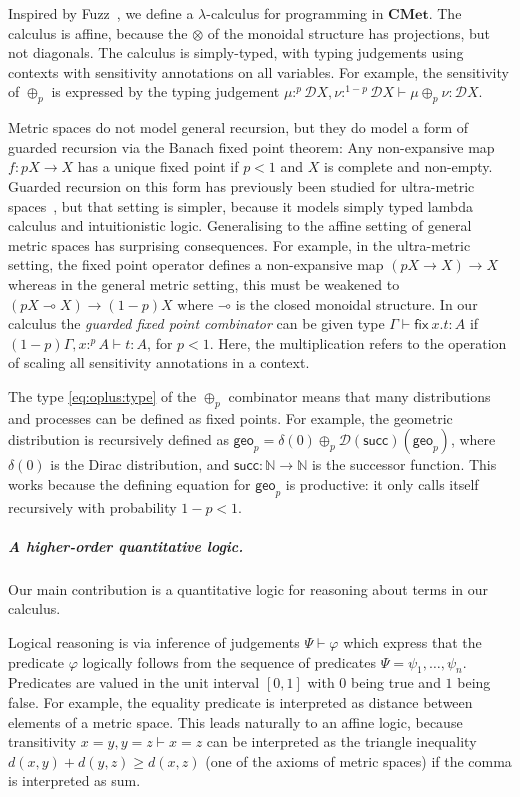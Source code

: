 \documentclass[a4paper,UKenglish,cleveref, autoref, thm-restate]{lipics-v2021}
\newcommand{\lol}{\mathbin{\multimap}}
\newcommand{\cat}[1]{\mathbf{#1}}
\newcommand{\CMet}{\cat{CMet}}
\newcommand{\mprod}{\otimes}
\newcommand{\mexp}{\lol}
\newcommand{\nat}{\mathbb{N}}
\newcommand{\uinterval}{[0,1]}
\newcommand{\D}{\mathcal{D}}
\newcommand{\sminus}{\!-\!}
\newcommand{\scaling}{}
\newcommand{\ts}{\vdash}
\newcommand{\hastype}[3]{#1\ts #2 : #3}
\newcommand{\geo}[1][p]{\mathsf{geo}_{#1}}
\newcommand{\fix}[2]{\mathsf{fix~} #1 . #2 }
\newcommand{\Succbare}{\mathsf{succ}}
\newcommand{\TD}{\mathcal{D}}
\newcommand{\peq}{=}
\begin{document}
Inspired by Fuzz~\cite{ReedP10}, we define a $\lambda$-calculus for programming in $\CMet$. The calculus is affine, because the $\mprod$ of the monoidal
structure has projections, but not diagonals. The calculus is simply-typed, with typing judgements using contexts with sensitivity annotations on all variables. For 
example, the sensitivity of $\oplus_p$ is expressed by the typing judgement $\hastype{\mu :^p \TD X, \nu :^{1-p}\TD X}{\mu \oplus_p \nu}{\TD X}$. 

Metric spaces do not model general recursion, but they do model a form of guarded recursion via the Banach 
fixed point theorem: Any non-expansive map $f \colon p\scaling X \to X$ has a unique 
fixed point if $p < 1$ and $X$ is complete and non-empty. Guarded recursion on this form has previously been 
studied for ultra-metric spaces~\cite{VinkR99}, but
that setting is simpler, because it models simply typed lambda calculus and intuitionistic logic. Generalising to the 
affine setting of general metric spaces has surprising consequences. For example, in the ultra-metric setting, the fixed 
point operator defines a non-expansive map $(p \scaling X \to X) \to X$ whereas in the general metric setting, this must be 
weakened to $(p \scaling X \mexp X) \to (1-p)\scaling X$ where $\mexp$ is the closed monoidal structure. In our 
calculus the \emph{guarded fixed point combinator} can be given type $\Gamma \vdash \fix{x}{t} : A$ 
if $(1\sminus p)\scaling\Gamma, x:^pA \vdash t : A$, for $p < 1$. Here, 
the multiplication refers to the operation of scaling all
sensitivity annotations in a context.

The type \eqref{eq:oplus:type} of the $\oplus_p$ combinator means that many distributions and processes can be defined as 
fixed points.
For example, the geometric distribution is recursively defined as 
$\geo = \delta(0) \oplus_p \D(\Succbare)(\geo)$, where $\delta(0)$ is the Dirac distribution, and $\Succbare \colon \nat \to \nat$ is the
successor function. 
This works because the defining 
equation for $\geo$ is productive: it only calls itself recursively with probability $1-p < 1$. 

\subparagraph*{A higher-order quantitative logic.}
Our main contribution is a quantitative logic for reasoning about terms in our calculus. 

Logical reasoning is via inference of judgements $\Psi \vdash \varphi$ which express that the predicate $\varphi$ logically follows from the sequence of predicates $\Psi = \psi_1, \dots, \psi_n$. 
Predicates are valued in 
the unit interval $\uinterval$ with $0$ being true and $1$ being false. For example, the equality
predicate is interpreted as distance between elements of a metric space. 
This leads naturally to an affine logic, because 
transitivity $x\peq y, y\peq z \ts x \peq z$ can be interpreted as the triangle inequality 
$d(x,y) + d(y,z) \geq d(x,z)$ (one of the axioms of metric spaces) if the comma is interpreted as sum. 
\end{document}

